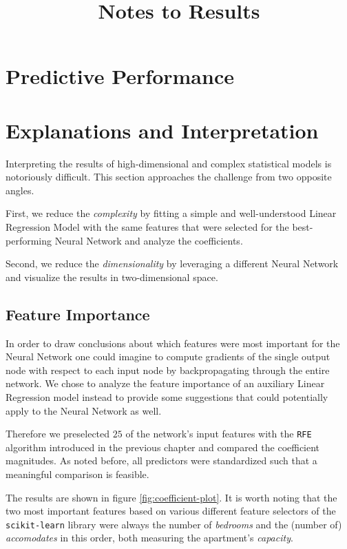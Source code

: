 \documentclass[12pt, letterpaper]{article}
\title{Notes to Results}
\author{}
\date{}
\begin{document}
\maketitle

\section{Predictive Performance}



\section{Explanations and Interpretation}

Interpreting the results of high-dimensional and complex statistical models is notoriously difficult.
This section approaches the challenge from two opposite angles.

First, we reduce the \emph{complexity} by fitting a simple and well-understood Linear Regression Model with the same features that were selected for the best-performing Neural Network and analyze the coefficients.

Second, we reduce the \emph{dimensionality} by leveraging a different Neural Network and visualize the results in two-dimensional space.

\subsection{Feature Importance}

In order to draw conclusions about which features were most important for the Neural Network one could imagine to compute gradients of the single output node with respect to each input node by backpropagating through the entire network.
We chose to analyze the feature importance of an auxiliary Linear Regression model instead to provide some suggestions that could potentially apply to the Neural Network as well.

Therefore we preselected $25$ of the network's input features with the \texttt{RFE} algorithm introduced in the previous chapter and compared the coefficient magnitudes.
As noted before, all predictors were standardized such that a meaningful comparison is feasible.

The results are shown in figure \ref{fig:coefficient-plot}.
It is worth noting that the two most important features based on various different feature selectors of the \texttt{scikit-learn} library were always the number of \emph{bedrooms} and the (number of) \emph{accomodates} in this order, both measuring the apartment's \emph{capacity}.
\end{document}

